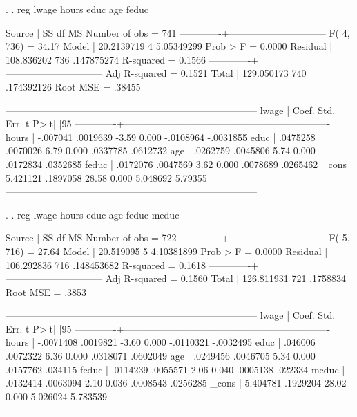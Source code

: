 \documentclass[12pt]{article}
\begin{document}
\begin{stlog}
. 
. reg lwage hours educ age feduc

      Source |       SS       df       MS              Number of obs =     741
-------------+------------------------------           F(  4,   736) =   34.17
       Model |  20.2139719     4  5.05349299           Prob > F      =  0.0000
    Residual |  108.836202   736  .147875274           R-squared     =  0.1566
-------------+------------------------------           Adj R-squared =  0.1521
       Total |  129.050173   740  .174392126           Root MSE      =  .38455

------------------------------------------------------------------------------
       lwage |      Coef.   Std. Err.      t    P>|t|     [95%
-------------+----------------------------------------------------------------
       hours |   -.007041   .0019639    -3.59   0.000    -.0108964   -.0031855
        educ |   .0475258   .0070026     6.79   0.000     .0337785    .0612732
         age |   .0262759   .0045806     5.74   0.000     .0172834    .0352685
       feduc |   .0172076   .0047569     3.62   0.000     .0078689    .0265462
       _cons |   5.421121   .1897058    28.58   0.000     5.048692     5.79355
------------------------------------------------------------------------------

. 
. reg lwage hours educ age feduc meduc

      Source |       SS       df       MS              Number of obs =     722
-------------+------------------------------           F(  5,   716) =   27.64
       Model |   20.519095     5  4.10381899           Prob > F      =  0.0000
    Residual |  106.292836   716  .148453682           R-squared     =  0.1618
-------------+------------------------------           Adj R-squared =  0.1560
       Total |  126.811931   721    .1758834           Root MSE      =   .3853

------------------------------------------------------------------------------
       lwage |      Coef.   Std. Err.      t    P>|t|     [95%
-------------+----------------------------------------------------------------
       hours |  -.0071408   .0019821    -3.60   0.000    -.0110321   -.0032495
        educ |    .046006   .0072322     6.36   0.000     .0318071    .0602049
         age |   .0249456   .0046705     5.34   0.000     .0157762     .034115
       feduc |   .0114239   .0055571     2.06   0.040     .0005138     .022334
       meduc |   .0132414   .0063094     2.10   0.036     .0008543    .0256285
       _cons |   5.404781   .1929204    28.02   0.000     5.026024    5.783539
------------------------------------------------------------------------------
\end{stlog}
\end{document}
